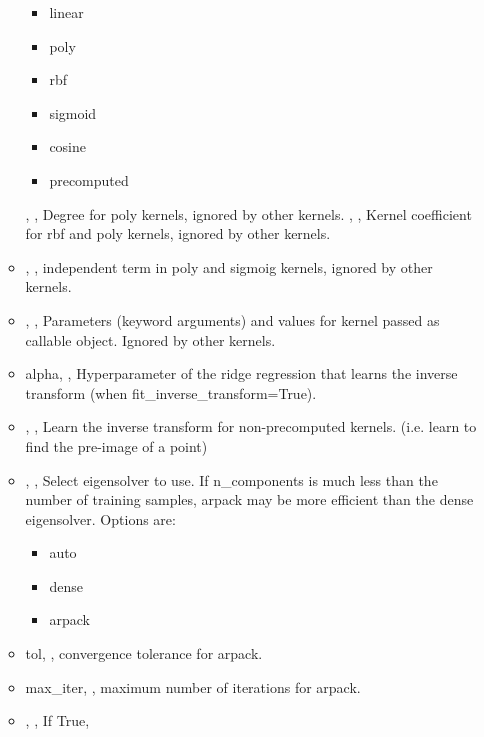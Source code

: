 \begin{itemize}
\begin{itemize}
\begin{itemize}
			\item linear
			\item poly
			\item rbf
			\item sigmoid
			\item cosine
			\item precomputed
		\end{itemize}
		, , Degree for poly
		 kernels, ignored by other kernels. 
		, , Kernel coefficient
		 for rbf and poly kernels, ignored by other kernels. 
		\item {}, , independent term in
		 poly and sigmoig kernels, ignored by other kernels.
		\item {}, , Parameters (keyword arguments) and values for kernel passed as
		callable object. Ignored by other kernels. 
		\item{alpha}, , Hyperparameter of the ridge
		regression that learns the inverse transform (when fit\_inverse\_transform=True).
		\item {}, ,
		Learn the inverse transform for non-precomputed kernels. (i.e. learn to find
		 the pre-image of a point) 
		\item {}, , Select eigensolver
		 to use. If n\_components is much less than the number of training samples,
		arpack may be more efficient than the dense eigensolver. Options are:
		\begin{itemize}
			\item auto
			\item dense
			\item arpack
		\end{itemize} 
		\item{tol}, , convergence tolerance for arpack.
		\item{max\_iter}, , maximum number of iterations
		for arpack. 
		\item {}, , If True,

\end{itemize}
\end{itemize}
